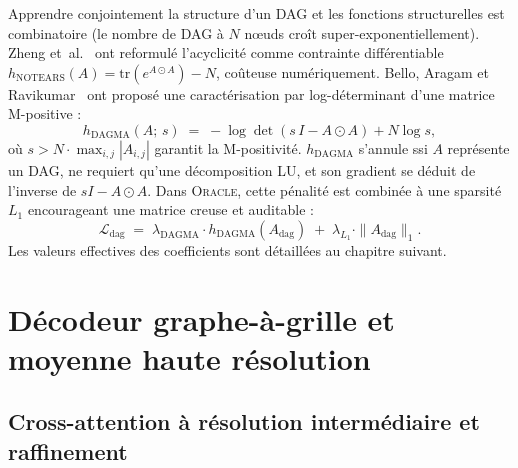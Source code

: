 \documentclass[14pt,a4paper,openany]{extreport}
\theoremstyle{definition}
\newcommand{\Oracle}{\textsc{Oracle}}
\newcommand{\Adag}{\ensuremath{A_{\mathrm{dag}}}}
\begin{document}
Apprendre conjointement la structure d'un DAG et les fonctions structurelles est combinatoire (le nombre de DAG à $N$ nœuds croît super-exponentiellement). Zheng et~al.~\cite{zheng_notears_2018} ont reformulé l'acyclicité comme contrainte différentiable $h_{\mathrm{NOTEARS}}(A) = \mathrm{tr}(e^{A \odot A}) - N$, coûteuse numériquement. Bello, Aragam et Ravikumar~\cite{bello_dagma_2022} ont proposé une caractérisation par log-déterminant d'une matrice M-positive :
\begin{equation}
  h_{\mathrm{DAGMA}}(A;\, s) \;=\; -\log \det\!\left( s\,I - A \odot A \right) + N \log s,
  \label{eq:dagma}
\end{equation}
où $s > N \cdot \max_{i,j} |A_{i,j}|$ garantit la M-positivité. $h_{\mathrm{DAGMA}}$ s'annule ssi $A$ représente un DAG, ne requiert qu'une décomposition LU, et son gradient se déduit de l'inverse de $sI - A \odot A$. Dans \Oracle{}, cette pénalité est combinée à une sparsité $L_1$ encourageant une matrice creuse et auditable :
\begin{equation}
  \mathcal{L}_{\mathrm{dag}} \;=\; \lambda_{\mathrm{DAGMA}} \cdot h_{\mathrm{DAGMA}}(\Adag) \;+\; \lambda_{L_1} \cdot \|\Adag\|_1.
  \label{eq:loss-dag}
\end{equation}
Les valeurs effectives des coefficients sont détaillées au chapitre suivant.

\section{Décodeur graphe-à-grille et moyenne haute résolution}
\label{sec:oracle-decoder}

\subsection{Cross-attention à résolution intermédiaire et raffinement}
\label{ssec:oracle-decoder-principe}
\end{document}
